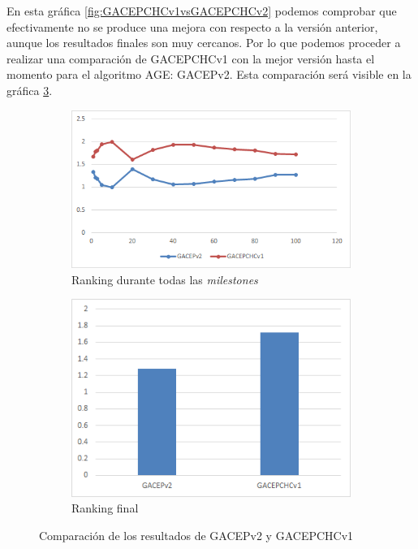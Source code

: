 En esta gráfica \ref{fig:GACEPCHCv1vsGACEPCHCv2} podemos comprobar que efectivamente no se produce una mejora con respecto a la versión anterior, aunque los resultados finales son muy cercanos. 
Por lo que podemos proceder a realizar una comparación de GACEPCHCv1 con la mejor versión hasta el momento para el algoritmo AGE: GACEPv2. 
Esta comparación será visible en la gráfica \ref{fig:GACEPv2vsGACEPCHCv1}.

\begin{figure}[h]
     \centering
     \begin{subfigure}[b]{0.45\textwidth}
         \centering
         \includegraphics[width=\textwidth]{imagenes/Experimental/GACEPv2vsGACEPCHCv1.png}
         \caption{Ranking durante todas las \textit{milestones}}
         \label{fig:GACEPv2vsGACEPCHCv1_lineas}
     \end{subfigure}
     \hfill
     \begin{subfigure}[b]{0.45\textwidth}
         \centering
         \includegraphics[width=\textwidth]{imagenes/Experimental/barras/GACEPv2vsGACEPCHCv1.png}
         \caption{Ranking final}
         \label{fig:GACEPv2vsGACEPCHCv1_barras}
     \end{subfigure}
        \caption{Comparación de los resultados de GACEPv2 y GACEPCHCv1}
        \label{fig:GACEPv2vsGACEPCHCv1}
\end{figure}

